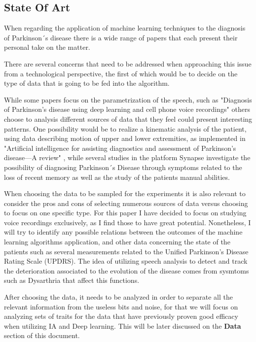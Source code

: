 \documentclass[12pt, a4paper]{article}
\begin{document}
	\subsection{State Of Art}
	
	When regarding the application of machine learning techniques to the diagnosis of Parkinson´s disease there is a wide range of papers that each present their personal take on the matter.
	
	There are several concerns that need to be addressed when approaching this issue from a technological perspective, the first of which would be to decide on the type of data that is going to be fed into the algorithm.
	
	While some papers focus on the parametrization of the speech, such as "Diagnosis of Parkinson's disease using deep learning and cell phone voice recordings" \cite{deeplearningygrabaciones} others choose to analysis different sources of data that they feel could present interesting patterns. One possibility would be to realize a kinematic analysis of the patient, using data describing motion of upper and lower extremities, as implemented in "Artificial intelligence for assisting diagnostics and assessment of Parkinson’s disease—A review" \cite{belic2019artificial}, while several studies in the platform Synapse investigate the possibility of diagnosing Parkinson´s Disease through symptoms related to the loss of recent memory as well as the study of the patients manual abilities.
	
	When choosing the data to be sampled for the experiments it is also relevant to consider the pros and cons of selecting numerous sources of data versus choosing to focus on one specific type. For this paper I have decided to focus on studying voice recordings exclusively, as I find those to have great potential. Nonetheless, I will try to identify any possible relations between the outcomes of the machine learning algorithms application, and other data concerning the state of the patients such as several measurements related to the Unified Parkinson's Disease Rating Scale (UPDRS). The idea of utilizing speech analysis to detect and track the deterioration associated to the evolution of the disease comes from sysmtoms such as Dysarthria that affect this functions. \cite{cnntoformantmeasures}
	
	After choosing the data, it needs to be analyzed in order to separate all the relevant information from the useless bits and noise, for that we will focus on analyzing sets of traits for the data that have previously proven good efficacy when utilizing IA and Deep learning. This will be later discussed on the \textbf{Data} section of this document.
	
\end{document}
